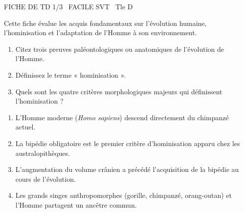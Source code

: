 \documentclass[11pt]{article}
\begin{document}
\begin{tcolorbox}[enhanced,colback=popink,colframe=popink,arc=10pt,boxrule=0pt,left=12pt,right=12pt,top=9pt,bottom=9pt]
{\color{white}\popxbold\small FICHE DE TD 1/3 \textbullet\ FACILE \hfill SVT \textbullet\ Tle D\par}
\end{tcolorbox}
\vspace{4pt}
Cette fiche évalue les acquis fondamentaux sur l'évolution humaine, l'hominisation et l'adaptation de l'Homme à son environnement.

\begin{exercice}
\begin{enumerate}
    \item Citez trois preuves paléontologiques ou anatomiques de l'évolution de l'Homme.
    \item Définissez le terme « hominisation ».
    \item Quels sont les quatre critères morphologiques majeurs qui définissent l'hominisation ?
\end{enumerate}
\end{exercice}

\begin{exercice}
\begin{enumerate}
    \item L'Homme moderne (\textit{Homo sapiens}) descend directement du chimpanzé actuel.
    \item La bipédie obligatoire est le premier critère d'hominisation apparu chez les australopithèques.
    \item L'augmentation du volume crânien a précédé l'acquisition de la bipédie au cours de l'évolution.
    \item Les grands singes anthropomorphes (gorille, chimpanzé, orang-outan) et l'Homme partagent un ancêtre commun.
\end{enumerate}
\end{exercice}
\end{document}
